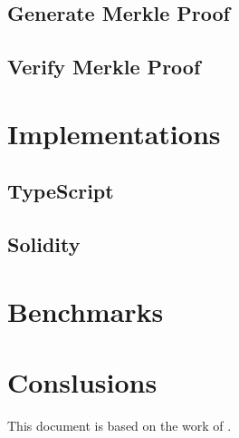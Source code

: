 \documentclass{article}
\begin{document}
\bigbreak

\subsection{Generate Merkle Proof}

\bigbreak

\subsection{Verify Merkle Proof}

\bigbreak

\section{Implementations}

\bigbreak

\subsection{TypeScript}

\bigbreak

\subsection{Solidity}

\bigbreak

\section{Benchmarks}

\section{Conslusions}

This document is based on the work of \cite{semaphorev1whitepaper}.

\sloppy

\printbibliography

\end{document}
